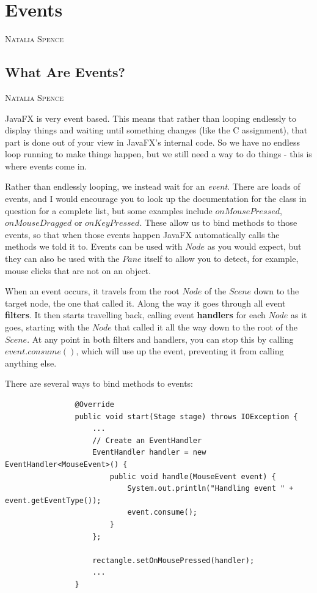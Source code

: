 \documentclass[a4paper]{report}
\makeatletter
\newcommand{\chapterauthor}[1]{%
	{\parindent0pt\vspace*{-25pt}%
		\linespread{1.1}\large\scshape#1%
		\par\nobreak\vspace*{25pt}}
	\@afterheading%
}
\newcommand{\sectionauthor}[1]{%
	{\parindent0pt\vspace*{0pt}%
		\linespread{1.1}\large\scshape#1%
		\par\nobreak\vspace*{10pt}}
	\@afterheading%
}
\makeatother
\begin{document}
	\chapter{Events}\label{chap:events}
	\chapterauthor{Natalia Spence}
		
		\section{What Are Events?}\label{sec:what are events}
		\sectionauthor{Natalia Spence}
		
			JavaFX is very event based. This means that rather than looping endlessly to display things and waiting until something changes (like the C assignment), that part is done out of your view in JavaFX's internal code. So we have no endless loop running to make things happen, but we still need a way to do things - this is where events come in.
			
			Rather than endlessly looping, we instead wait for an \textit{event}. There are loads of events, and I would encourage you to look up the documentation for the class in question for a complete list, but some examples include $onMousePressed$, $onMouseDragged$ or $onKeyPressed$. These allow us to bind methods to those events, so that when those events happen JavaFX automatically calls the methods we told it to. Events can be used with $Node$ as you would expect, but they can also be used with the $Pane$ itself to allow you to detect, for example, mouse clicks that are not on an object.
			
			When an event occurs, it travels from the root $Node$ of the $Scene$ down to the target node, the one that called it. Along the way it goes through all event \textbf{filters}. It then starts travelling back, calling event \textbf{handlers} for each $Node$ as it goes, starting with the $Node$ that called it all the way down to the root of the $Scene$. At any point in both filters and handlers, you can stop this by calling $event.consume()$, which will use up the event, preventing it from calling anything else.
			
			There are several ways to bind methods to events:
			
			\begin{lstlisting}
				@Override
				public void start(Stage stage) throws IOException {
					...
					// Create an EventHandler
					EventHandler handler = new EventHandler<MouseEvent>() {
						public void handle(MouseEvent event) {
							System.out.println("Handling event " + event.getEventType()); 
							event.consume();
						}
					};
					
					rectangle.setOnMousePressed(handler);
					...
				}
			\end{lstlisting}
			
\end{document}
